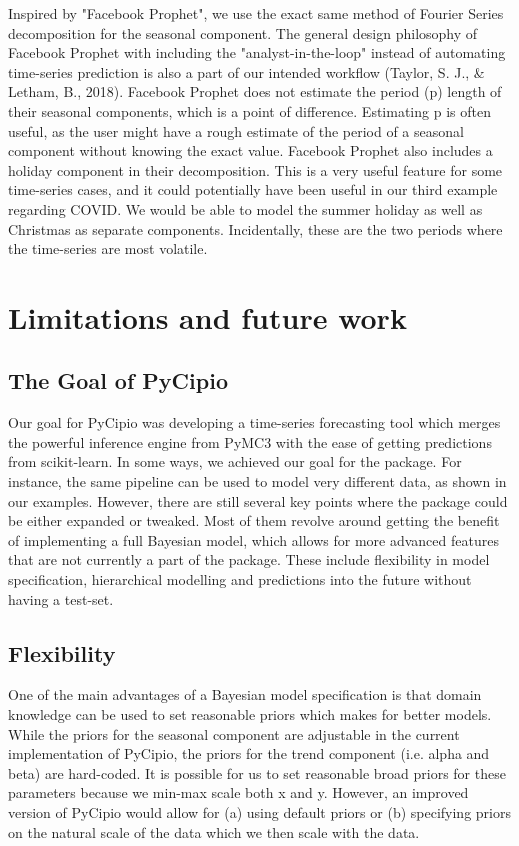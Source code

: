 \documentclass{article}
\begin{document}
Inspired by "Facebook Prophet", we use the exact same method of Fourier Series decomposition for the seasonal component. The general design philosophy of Facebook Prophet with including the "analyst-in-the-loop" instead of automating time-series prediction is also a part of our intended workflow (Taylor, S. J., \& Letham, B., 2018). 
Facebook Prophet does not estimate the period (p) length of their seasonal components, which is a point of difference. Estimating p is often useful, as the user might have a rough estimate of the period of a seasonal component without knowing the exact value. Facebook Prophet also includes a holiday component in their decomposition. This is a very useful feature for some time-series cases, and it could potentially have been useful in our third example regarding COVID. We would be able to model the summer holiday as well as Christmas as separate components. Incidentally, these are the two periods where the time-series are most volatile.


\section{Limitations and future work}

\subsection{The Goal of PyCipio}

Our goal for PyCipio was developing a time-series forecasting tool which merges the powerful inference engine from PyMC3 with the ease of getting predictions from scikit-learn. In some ways, we achieved our goal for the package. For instance, the same pipeline can be used to model very different data, as shown in our examples. However, there are still several key points where the package could be either expanded or tweaked. Most of them revolve around getting the benefit of implementing a full Bayesian model, which allows for more advanced features that are not currently a part of the package. These include flexibility in model specification, hierarchical modelling and predictions into the future without having a test-set. 


\subsection{Flexibility}

One of the main advantages of a Bayesian model specification is that domain knowledge can be used to set reasonable priors which makes for better models. While the priors for the seasonal component are adjustable in the current implementation of PyCipio, the priors for the trend component (i.e. alpha and beta) are hard-coded. It is possible for us to set reasonable broad priors for these parameters because we min-max scale both x and y. However, an improved version of PyCipio would allow for (a) using default priors or (b) specifying priors on the natural scale of the data which we then scale with the data. 
\end{document}
